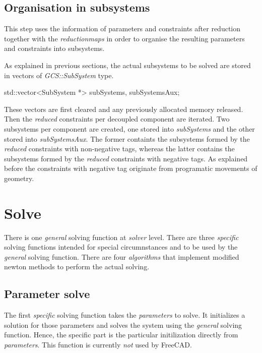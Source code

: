 \documentclass[12pt,twoside,a4paper]{book}
\begin{document}
    \subsection{Organisation in subsystems}

    This step uses the information of parameters and constraints after reduction together with the \emph{reductionmaps} in order to organise the resulting parameters and constraints into subsystems.

    As explained in previous sections, the actual subsystems to be solved are stored in vectors of \emph{GCS::SubSystem} type.

    \begin{codequote}
    std::vector\textless{}SubSystem *\textgreater{} subSystems, subSystemsAux;
    \end{codequote}

    These vectors are first cleared and any previously allocated memory released. Then the \emph{reduced} constraints per decoupled component are iterated. Two subsystems per component are created, one stored into \emph{subSystems} and the other stored into \emph{subSystemsAux}. The former containts the subsystems formed by the \emph{reduced} constraints with non-negative tags, whereas the latter contains the subsystems formed by the \emph{reduced} constraints with negative tags. As explained before the constraints with negative tag originate from programatic movements of geometry.

    \section{Solve}

    There is one \emph{general} solving function at \emph{solver} level. There are three \emph{specific} solving functions intended for special circumnstances and to be used by the \emph{general} solving function. There are four \emph{algorithms} that implement modified newton methods to perform the actual solving.

    \subsection{Parameter solve}

    The first \emph{specific} solving function takes the \emph{parameters} to solve. It initializes a solution for those parameters and solves the system using the \emph{general} solving function. Hence, the specific part is the particular initilization directly from \emph{parameters}. This function is currently \emph{not} used by FreeCAD.
\end{document}
